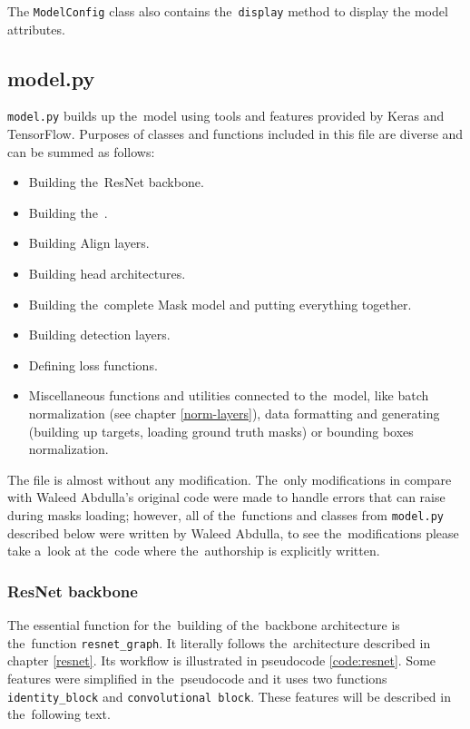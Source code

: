 The \verb|ModelConfig| class also contains the~\verb|display| method to display 
the model attributes.

\subsection{model.py}
\label{model}

\verb|model.py| builds up the~model using tools and features provided by Keras 
and TensorFlow. Purposes of classes and functions included in this file are 
diverse and can be summed as follows:
\begin{itemize}
	\item Building the~ResNet backbone.
	\item Building the~.
	\item Building Align layers.
	\item Building head architectures.
	\item Building the~complete Mask  model and putting everything together.
	\item Building detection layers.
	\item Defining loss functions.
	\item Miscellaneous functions and utilities connected to the~model, like batch normalization (see chapter \ref{norm-layers}), data formatting and generating (building up targets, loading ground truth masks) or bounding boxes normalization.
\end{itemize}

The file is almost without any modification. The~only modifications in compare 
with Waleed Abdulla's original code were made to handle errors that can raise 
during masks loading; however, all of the~functions and classes from 
\verb|model.py| described below were written by Waleed Abdulla, to see
the~modifications please take a~look at the~code where the~authorship is 
explicitly written.

\subsubsection{ResNet backbone}
\label{model-resnet}

The essential function for the~building of the~backbone architecture is
the~function \verb|resnet_graph|. It literally follows the~architecture described in 
chapter \ref{resnet}. Its workflow is illustrated in pseudocode 
\ref{code:resnet}. Some features were simplified in the~pseudocode and it uses 
two functions \verb|identity_block| and \verb|convolutional block|. These 
features will be described in the~following text.

